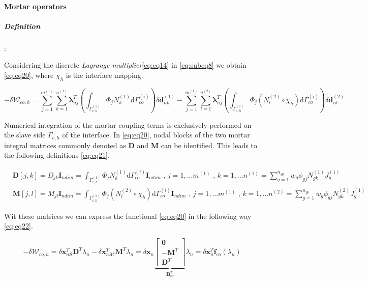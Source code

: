 \documentclass[a4paper,10pt]{article} %
\begin{document}
\paragraph{Mortar operators}\label{section:mortar}

\subparagraph{Definition}:

Considering the discrete \textit{Lagrange multiplier}\eqref{eq:eq14} in \eqref{eq:subeq8} we obtain \eqref{eq:eq20}, where $\chi_h$ is the interface mapping.

\begin{equation}\label{eq:eq20}
 -\delta \mathcal{W}_{co,h} = \sum_{j=1}^{m^{(1)}}\sum_{k=1}^{n^{(1)}} \boldsymbol{\lambda}_{nj}^T \left(\int_{\Gamma_{c,h}^{(1)}} \Phi_j N_k^{(1)} \text{d}\Gamma_{co}^{(i)} \right) \delta \mathbf{d}_{nk}^{(1)} -\sum_{j=1}^{m^{(1)}}\sum_{l=1}^{n^{(2)}} \boldsymbol{\lambda}_{nj}^T \left(\int_{\Gamma_{c,h}^{(1)}} \Phi_j \left(N_l^{(2)} \circ \chi_h\right) \text{d}\Gamma_{co}^{(i)} \right) \delta \mathbf{d}_{nl}^{(2)}
\end{equation}

Numerical integration of the mortar coupling terms is exclusively performed on the slave side $\Gamma_{c,h}$ of the interface. In \eqref{eq:eq20}, nodal blocks of the two mortar integral matrices commonly denoted as $\mathbf{D}$ and $\mathbf{M}$ can be identified. This leads to the following definitions \eqref{eq:eq21}.

 \begin{equation}\label{eq:eq21}
 \begin{aligned}
 & \mathbf{D}[j,k] = D_{jk} \mathbf{I}_{ndim} = \int_{\Gamma_{c,h}^{(1)}} \Phi_j N_k^{(1)}\text{d}\Gamma_{co}^{(i)}\mathbf{I}_{ndim}\text{ , } j=1,...m^{(1)}\text{ , } k= 1, ...n^{(1)} = \sum_{g = 1}^{n_{gp}} w_g \phi_{gj} N_{gk}^{(1)} J_g^{(1)} \\
 & \mathbf{M}[j,l] = M_{jl} \mathbf{I}_{ndim} = \int_{\Gamma_{c,h}^{(1)}} \Phi_j \left(N_l^{(2)} \circ \chi_h \right)\text{d}\Gamma_{co}^{(i)}\mathbf{I}_{ndim}\text{ , } j=1,...m^{(1)}\text{ , } k= 1, ...n^{(2)} = \sum_{g = 1}^{n_{gp}} w_g \phi_{gj} N_{gk}^{(2)} J_g^{(1)}
 \end{aligned}
\end{equation}

Wit these matrices we can express the functional \eqref{eq:eq20} in the following way \eqref{eq:eq22}.

\begin{equation}\label{eq:eq22}
 -\delta \mathcal{W}_{co,h} = \delta \mathbf{x}_{n\mathcal{S}}^T\mathbf{D}^T\lambda_n - \delta \mathbf{x}_{n\mathcal{M}}^T\mathbf{M}^T\lambda_n = \delta \mathbf{x}_n \underbrace{\left[\begin{array}{c} \mathbf{0} \\ -\mathbf{M}^T \\ \mathbf{D}^T\end{array} \right]}_{\mathbf{B}^T_{co}} \lambda_n = \delta \mathbf{x}_n^T \mathbf{f}_{co}(\lambda_n)
\end{equation}
\end{document}
